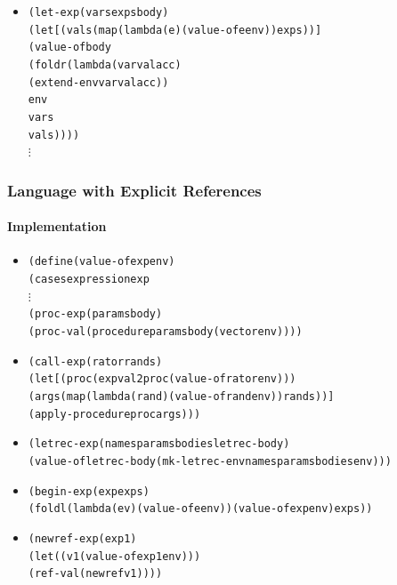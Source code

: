 \documentclass{beamer}
\newcommand{\vdotss}{\(\vdots\)}
\begin{document}
\begin{frame}[fragile]
\begin{tiny}
\begin{itemize}
\item<6->
\begin{alltt}
    (let-exp (vars exps body)
             (let [(vals (map (lambda (e) (value-of e env)) exps))]
               (value-of body
                         (foldr (lambda (var val acc)
                                  (extend-env var val acc))
                                env
                                vars
                                vals))))
    \vdotss
\end{alltt}

\end{itemize}
\end{tiny}
\end{frame}

\begin{frame}[fragile]
\frametitle{Language with Explicit References}
\framesubtitle{Implementation}
\begin{tiny}
\begin{itemize}
\item<1->
\begin{alltt}
(define (value-of exp env)
  (cases expression exp
    \vdotss{}
    (proc-exp (params body)
              (proc-val (procedure params body (vector env))))
\end{alltt}

\item<2->
\begin{alltt}
    (call-exp (rator rands)
              (let [(proc (expval2proc (value-of rator env)))
                    (args (map (lambda (rand) (value-of rand env)) rands))]
                (apply-procedure proc args)))
\end{alltt}

\item<3->
\begin{alltt}
    (letrec-exp (names params bodies letrec-body)
                (value-of letrec-body (mk-letrec-env names params bodies env)))
\end{alltt}

\item<4->
\begin{alltt}
    (begin-exp (exp exps)
               (foldl (lambda (e v) (value-of e env)) (value-of exp env) exps))
\end{alltt}

\item<5->
\begin{alltt}
    (newref-exp (exp1)
                (let ((v1 (value-of exp1 env)))
                  (ref-val (newref v1))))
\end{alltt}


\end{itemize}
\end{tiny}
\end{frame}
\end{document}
